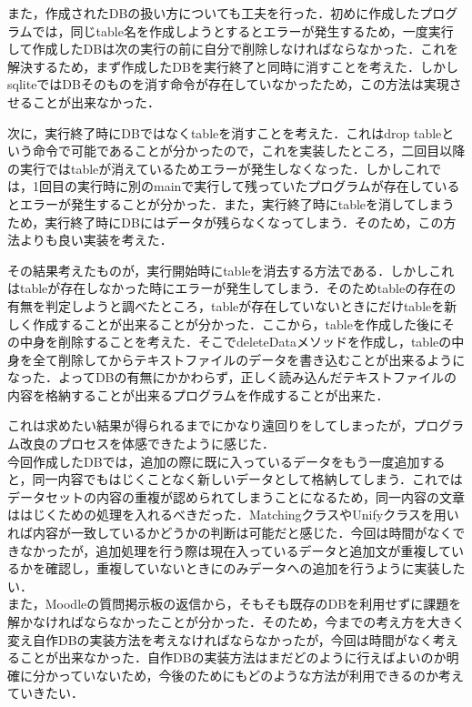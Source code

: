 \documentclass[12pt]{jarticle}
\begin{document}
また，作成されたDBの扱い方についても工夫を行った．初めに作成したプログラムでは，同じtable名を作成しようとするとエラーが発生するため，一度実行して作成したDBは次の実行の前に自分で削除しなければならなかった．これを解決するため，まず作成したDBを実行終了と同時に消すことを考えた．しかしsqliteではDBそのものを消す命令が存在していなかったため，この方法は実現させることが出来なかった．\par
次に，実行終了時にDBではなくtableを消すことを考えた．これはdrop tableという命令で可能であることが分かったので，これを実装したところ，二回目以降の実行ではtableが消えているためエラーが発生しなくなった．しかしこれでは，1回目の実行時に別のmainで実行して残っていたプログラムが存在しているとエラーが発生することが分かった．また，実行終了時にtableを消してしまうため，実行終了時にDBにはデータが残らなくなってしまう．そのため，この方法よりも良い実装を考えた．\par
その結果考えたものが，実行開始時にtableを消去する方法である．しかしこれはtableが存在しなかった時にエラーが発生してしまう．そのためtableの存在の有無を判定しようと調べたところ，tableが存在していないときにだけtableを新しく作成することが出来ることが分かった．ここから，tableを作成した後にその中身を削除することを考えた．そこでdeleteDataメソッドを作成し，tableの中身を全て削除してからテキストファイルのデータを書き込むことが出来るようになった．よってDBの有無にかかわらず，正しく読み込んだテキストファイルの内容を格納することが出来るプログラムを作成することが出来た．\par
これは求めたい結果が得られるまでにかなり遠回りをしてしまったが，プログラム改良のプロセスを体感できたように感じた．\\

今回作成したDBでは，追加の際に既に入っているデータをもう一度追加すると，同一内容でもはじくことなく新しいデータとして格納してしまう．これではデータセットの内容の重複が認められてしまうことになるため，同一内容の文章ははじくための処理を入れるべきだった．MatchingクラスやUnifyクラスを用いれば内容が一致しているかどうかの判断は可能だと感じた．今回は時間がなくできなかったが，追加処理を行う際は現在入っているデータと追加文が重複しているかを確認し，重複していないときにのみデータへの追加を行うように実装したい．\\

また，Moodleの質問掲示板の返信から，そもそも既存のDBを利用せずに課題を解かなければならなかったことが分かった．そのため，今までの考え方を大きく変え自作DBの実装方法を考えなければならなかったが，今回は時間がなく考えることが出来なかった．自作DBの実装方法はまだどのように行えばよいのか明確に分かっていないため，今後のためにもどのような方法が利用できるのか考えていきたい．
\end{document}

